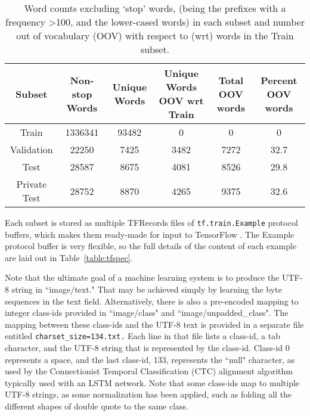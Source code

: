 \documentclass[runningheads]{llncs}
\begin{document}
\begin{table}
\begin{center}
\caption{Word counts excluding `stop' words, (being the prefixes with a frequency \textgreater 100, and the lower-cased words) in each subset and number out of vocabulary (OOV) with respect to (wrt) words in the Train subset. }
\label{table:words}
{\scriptsize
\begin{tabulary}{\linewidth}{ | c | C | C | C | C | C |}
\hline
Subset       & Non-stop Words & Unique Words & Unique Words OOV wrt Train & Total OOV words    & Percent OOV words \\ \hline \hline
Train        & 1336341     & 93482        & 0             & 0         & 0 \\ \hline
Validation     & 22250      & 7425        & 3482          & 7272     & 32.7 \\ \hline
Test           & 28587        & 8675   & 4081        & 8526     & 29.8 \\ \hline
Private Test   & 28752      & 8870        & 4265          & 9375     & 32.6 \\ \hline
\end{tabulary}
}
\end{center}
\end{table}

Each subset is stored as multiple TFRecords files of \texttt{tf.train.Example} protocol buffers, which makes them ready-made
 for input to TensorFlow \cite{tensorflow}\cite{abadi2016tensorflow}.
 The Example protocol buffer is very flexible, so the full details of the content of each example are laid
 out in Table~\ref{table:tfspec}.

Note that the ultimate goal of a machine learning system is to produce the UTF-8 string in ``image/text."
 That may be achieved simply by learning the byte sequences in the text field. Alternatively, there is also a
 pre-encoded mapping to integer class-ids provided in ``image/class" and ``image/unpadded\_class".
 The mapping between these class-ids and the UTF-8 text is provided in a separate file entitled
 \texttt{charset\_size=134.txt.} Each line in that file lists a class-id, a tab character, and the UTF-8 string
 that is represented by the class-id. Class-id 0 represents a space, and the last class-id, 133,
 represents the ``null" character, as used by the Connectionist Temporal Classification (CTC) alignment
 algorithm \cite{graves2006connectionist} typically used with an LSTM network. Note that some
 class-ids map to multiple UTF-8 strings, as some normalization has been applied, such as folding all the different shapes of double quote to the same class.
\end{document}
